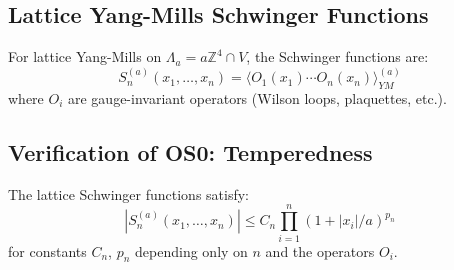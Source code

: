 \subsection{Lattice Yang-Mills Schwinger Functions}

\begin{definition}
\label{def:lattice-correlators}
For lattice Yang-Mills on $\Lambda_a = a\mathbb{Z}^4 \cap V$, the Schwinger 
functions are:
\begin{equation}
S_n^{(a)}(x_1, \ldots, x_n) = \langle O_1(x_1) \cdots O_n(x_n) \rangle_{YM}^{(a)}
\end{equation}
where $O_i$ are gauge-invariant operators (Wilson loops, plaquettes, etc.).
\end{definition}

\subsection{Verification of OS0: Temperedness}

\begin{theorem}
\label{thm:os0-lattice}
The lattice Schwinger functions satisfy:
\begin{equation}
|S_n^{(a)}(x_1, \ldots, x_n)| \leq C_n \prod_{i=1}^n (1 + |x_i|/a)^{p_n}
\end{equation}
for constants $C_n$, $p_n$ depending only on $n$ and the operators $O_i$.
\end{theorem}

